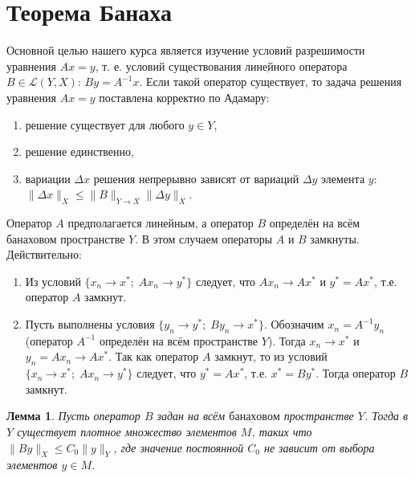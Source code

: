 \documentclass[12pt,a4paper,titlepage,oneside]{book}
\theoremstyle{definition}
\theoremstyle{plain}
\theoremstyle{break}
\theoremstyle{remark}
\theoremstyle{remark}
\theoremstyle{remark}
\theoremstyle{remark}
\theoremstyle{plain}
\newtheorem*{lemma}{Лемма}
\theoremstyle{plain}
\begin{document}
\section{Теорема Банаха}
Основной целью нашего курса является изучение условий разрешимости уравнения $Ax=y$, т. е. условий существования $\underbar {линейного}$ оператора $B\in \mathcal{L}(Y, X)$: $By=A^{-1}x$. Если такой оператор существует, то задача решения уравнения $Ax=y$ поставлена корректно по Адамару:
\begin{enumerate}
	\item решение существует для любого $y \in Y$,
	\item решение единственно,
	\item вариации $\Delta x$ решения непрерывно зависят от вариаций $\Delta y$ элемента $y$: $\lVert \Delta x\rVert_X \leqslant \lVert B\rVert_{Y\to X}\lVert \Delta y\rVert_X$.
\end{enumerate}
Оператор $A$ предполагается линейным, а оператор $B$ определён на всём банаховом пространстве $Y$. В этом случаем операторы $A$ и $B$ замкнуты. Действительно:
\begin{enumerate}

	\item Из условий $\lbrace x_n \to x^{*}; \; Ax_n \to y^{*} \rbrace$ следует, что $Ax_n \to Ax^{*}$ и $y^{*}=Ax^{*}$, т.е. оператор $A$ замкнут.

	\item Пусть выполнены условия $\lbrace y_n \to y^{*}; \; By_n \to x^{*} \rbrace$. Обозначим $x_n=A^{-1}y_n$ (оператор $A^{-1}$ определён на всём пространстве $Y$). Тогда $x_n \to x^{*}$ и $y_n=Ax_n \to Ax^{*}$. Так как оператор $A$ замкнут, то из условий $\lbrace x_n \to x^{*}; \; Ax_n \to y^{*} \rbrace$ следует, что $y^{*}=Ax^{*}$, т.е. $x^{*}=By^{*}$. Тогда оператор $B$ замкнут.
	
\end{enumerate}
	
\begin{lemma}
Пусть оператор $B$ задан на всём $\underbar {банаховом}$ пространстве $Y$. Тогда в $Y$ существует плотное множество элементов $M$, таких что $\lVert By\rVert_X \leqslant C_0\lVert y\rVert_Y $, где значение постоянной $C_0$ не зависит от выбора элементов $y \in M$.
\end{lemma}
\end{document}
